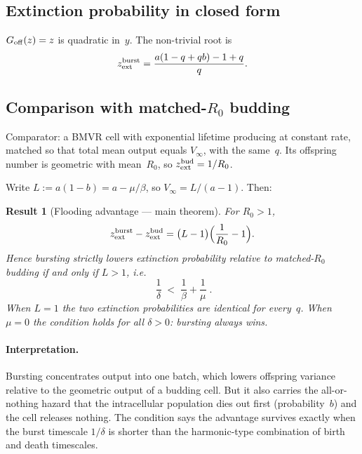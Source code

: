 \documentclass[11pt,a4paper]{article}
\theoremstyle{plain}
\newtheorem{result}{Result}[section]
\theoremstyle{definition}
\theoremstyle{remark}
\begin{document}
\subsection{Extinction probability in closed form}

$G_{\rm off}(z)=z$ is quadratic in~$y$. The non-trivial root is
\begin{equation}
z_{\rm ext}^{\rm burst}
=\frac{a(1-q+qb)-1+q}{q}.
\end{equation}

\subsection{\texorpdfstring{Comparison with matched-$R_0$ budding}{Comparison with matched-R0 budding}}

Comparator: a BMVR cell with exponential lifetime producing at constant rate,
matched so that total mean output equals $V_\infty$, with the same~$q$. Its
offspring number is geometric with mean~$R_0$, so
$z_{\rm ext}^{\rm bud}=1/R_0$.

Write $L:=a(1-b)=a-\mu/\beta$, so $V_\infty=L/(a-1)$. Then:
\begin{result}[Flooding advantage --- main theorem]
\label{res:flood}
For $R_0>1$,
\begin{equation}
z_{\rm ext}^{\rm burst}-z_{\rm ext}^{\rm bud}
=\bigl(L-1\bigr)\Bigl(\frac{1}{R_0}-1\Bigr).
\end{equation}
Hence bursting strictly lowers extinction probability relative to matched-$R_0$
budding if and only if $L>1$, i.e.
\begin{equation}
\boxed{\;
\frac{1}{\delta}\;<\;\frac{1}{\beta}+\frac{1}{\mu}\;}.
\end{equation}
When $L=1$ the two extinction probabilities are \emph{identical for every~$q$}.
When $\mu=0$ the condition holds for all $\delta>0$: bursting always wins.
\end{result}

\paragraph{Interpretation.}
Bursting concentrates output into one batch, which lowers offspring variance
relative to the geometric output of a budding cell. But it also carries the
all-or-nothing hazard that the intracellular population dies out first
(probability~$b$) and the cell releases nothing. The condition says the
advantage survives exactly when the burst timescale $1/\delta$ is shorter than
the harmonic-type combination of birth and death timescales.
\end{document}
